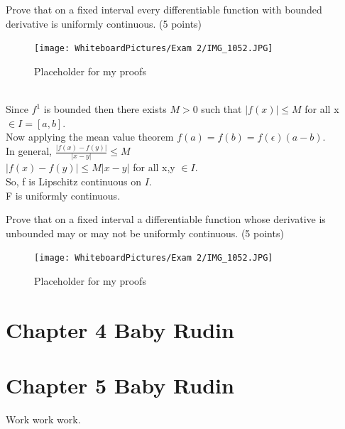 Prove that on a fixed interval every differentiable function with bounded derivative is uniformly continuous. (5 points)  

\begin{figure}[h]\begin{center}\texttt{[image: WhiteboardPictures/Exam 2/IMG\_1052.JPG]}
\caption{Placeholder for my proofs} \label{fig:Euler_pic}\end{center}\end{figure} 

\\ 
Since $f^1$ is bounded then there exists $M>0$ such that $|f(x)|\leq M$ for all x $\in I=[a,b].$ \\ 
Now applying the mean value theorem $f(a)=f(b)=f(\epsilon)(a-b).$ \\ 
In general, $\frac{|f(x)-f(y)|}{|x-y|} \leq M$ \\ 
$|f(x)-f(y)| \leq M|x-y|$ for all x,y $\in I.$ \\ 
So, f is Lipschitz continuous on $I.$ \\ 
F is uniformly continuous. 


\newpage 
Prove that on a fixed interval a differentiable function whose derivative is unbounded may or may not be uniformly continuous. (5 points) 

\begin{figure}[h]\begin{center}\texttt{[image: WhiteboardPictures/Exam 2/IMG\_1052.JPG]}
\caption{Placeholder for my proofs} \label{fig:Euler_pic}\end{center}\end{figure} 


\section{Chapter 4 Baby Rudin}



\section{Chapter 5 Baby Rudin}


Work work work.




\section{}